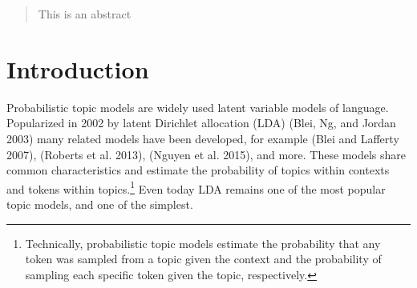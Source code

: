 \documentclass[conference,final,]{IEEEtran}
\begin{document}




\maketitle

\begin{abstract}
This is an abstract
\end{abstract}





\maketitle


%
\IEEEpeerreviewmaketitle


\hypertarget{introduction}{%
\section{Introduction}\label{introduction}}

Probabilistic topic models are widely used latent variable models of
language. Popularized in 2002 by latent Dirichlet allocation (LDA)
(Blei, Ng, and Jordan 2003) many related models have been developed, for
example (Blei and Lafferty 2007), (Roberts et al. 2013), (Nguyen et al.
2015), and more. These models share common characteristics and estimate
the probability of topics within contexts and tokens within
topics.\footnote{Technically, probabilistic topic models estimate the
  probability that any token was sampled from a topic given the context
  and the probability of sampling each specific token given the topic,
  respectively.} Even today LDA remains one of the most popular topic
models, and one of the simplest.
\end{document}
